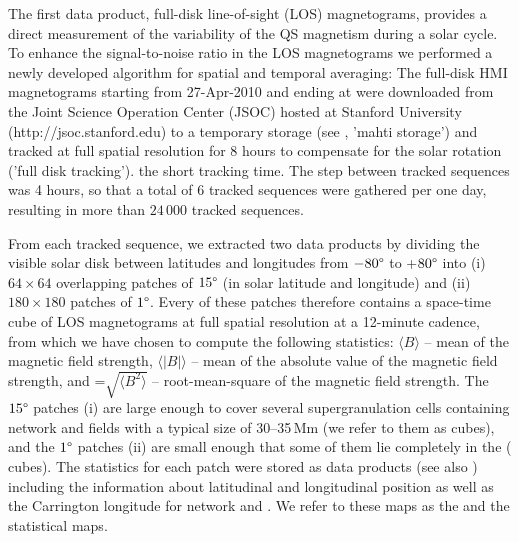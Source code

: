 \documentclass{aa}
\begin{document}
The first data product, full-disk line-of-sight (LOS) magnetograms, provides a direct measurement of the variability of the %
QS
magnetism during a solar cycle. To enhance the signal-to-noise ratio in the LOS magnetograms we performed a newly developed algorithm for spatial and temporal averaging: The full-disk HMI magnetograms starting from 27-Apr-2010 and ending at 
were downloaded from the Joint Science Operation Center (JSOC) hosted at Stanford University (http://jsoc.stanford.edu) to a temporary storage (see , 'mahti storage') and tracked at full spatial resolution for 8 hours to compensate for the solar rotation ('full disk tracking').
the short tracking time.
The step between tracked sequences was 4 hours, so that a total of 6 tracked sequences were gathered per one day, resulting in more than 
$24\,000$ tracked sequences.

From each tracked sequence, we extracted two data products by dividing the visible solar disk  between latitudes and longitudes from $-80\degree$ to +$80\degree$ into (i) $64\times 64$  overlapping patches of $15\degree$ (in solar latitude and longitude)  and (ii) $180\times 180$ patches of $1\degree$.
Every of these patches therefore contains a space-time cube of LOS magnetograms at full spatial resolution at a 12-minute cadence, %
from which we have chosen to compute the following statistics:
$\langle B\rangle$ -- mean of the magnetic field strength, $\langle|B|\rangle$ -- mean of the absolute value of the magnetic field strength, and %
\brms{}=$\sqrt{\langle B^2\rangle}$ -- root-mean-square of the magnetic field strength.
The $15\degree$ patches (i) are large enough to cover several supergranulation cells containing network and \IN{} fields \cite[]{2010LRSP....7....2R} with a typical size of 30--35\,Mm (we refer to them as \nw{} cubes), and the $1\degree$ patches (ii) are small enough that some of them lie completely in the \IN{} (\inw{} cubes). 
The statistics for each patch were stored as data products (see also ) including the information about 
latitudinal and longitudinal position as well as the Carrington %
longitude for network and \IN{}. We refer to these maps as the \nw{} and the \inw{} statistical maps.
\end{document}
